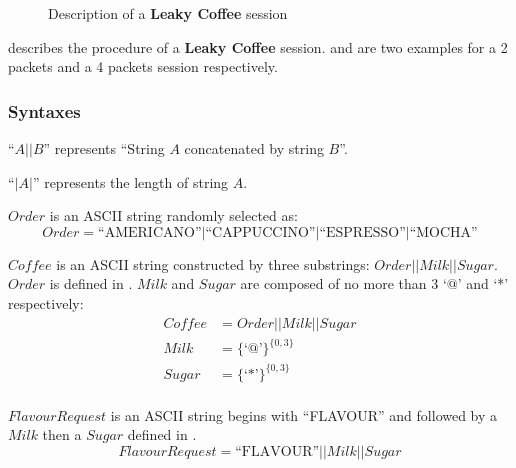 \begin{figure}[H]
\centering
\resizebox{12cm}{!}
{}
\caption{Description of a \textbf{Leaky Coffee} session}
\label{Fig: Description of a Leaky Coffee session}
\end{figure}

 describes the procedure of a \textbf{Leaky Coffee} session.  and  are two examples for a 2 packets and a 4 packets session respectively.

\subsubsection{Syntaxes}
“$A||B$” represents “String $A$ concatenated by string $B$”. 

“$|A|$” represents the length of string $A$.

\begin{definition} \label{Def: Order}
$Order$ is an ASCII string randomly selected as:
\begin{equation*}
Order = \text{“AMERICANO”} | \text{“CAPPUCCINO”} | \text{“ESPRESSO”} | \text{“MOCHA”}
\end{equation*}
\end{definition}

\begin{definition} \label{Def: Coffee}
$Coffee$ is an ASCII string constructed by three substrings: $Order || Milk || Sugar$. $Order$ is defined in . $Milk$ and $Sugar$ are composed of no more than 3 ‘@’ and ‘*’ respectively:\\
\begin{equation*}
\begin{aligned}
Coffee &= Order || Milk || Sugar\\
Milk &= \{\text{‘@’}\}^{\{0,3\}}\\
Sugar &= \{\text{‘*’}\}^{\{0,3\}}\\
\end{aligned}
\end{equation*}
\end{definition}

\begin{definition} \label{Def: FlavourRequest}
$FlavourRequest$ is an ASCII string begins with “FLAVOUR” and followed by a $Milk$ then a $Sugar$ defined in .
\begin{equation*}
FlavourRequest = \text{“FLAVOUR”} || Milk || Sugar
\end{equation*}
\end{definition}


